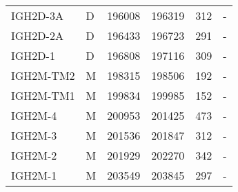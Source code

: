 \begin{tabular}{llrrrl}
  IGH2D-3A & D & 196008 & 196319 & 312 & - \\ 
  IGH2D-2A & D & 196433 & 196723 & 291 & - \\ 
  IGH2D-1 & D & 196808 & 197116 & 309 & - \\ 
  IGH2M-TM2 & M & 198315 & 198506 & 192 & - \\ 
  IGH2M-TM1 & M & 199834 & 199985 & 152 & - \\ 
  IGH2M-4 & M & 200953 & 201425 & 473 & - \\ 
  IGH2M-3 & M & 201536 & 201847 & 312 & - \\ 
  IGH2M-2 & M & 201929 & 202270 & 342 & - \\ 
  IGH2M-1 & M & 203549 & 203845 & 297 & - \\ 
   \bottomrule \end{tabular}
